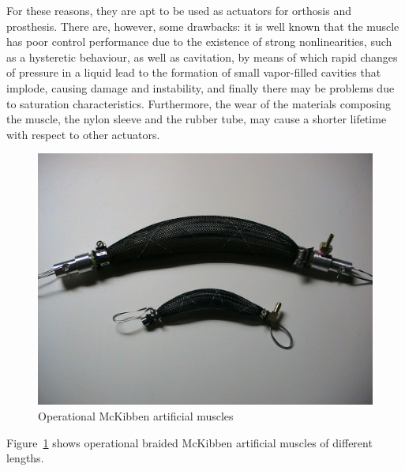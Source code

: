 For these reasons, they are apt to be used as actuators for orthosis and prosthesis.
There are, however, some drawbacks: it is well known that the muscle
has poor control performance due to the existence of strong nonlinearities,
such as a hysteretic behaviour, as well as cavitation, by means of which
rapid changes of pressure in a liquid lead to the formation of small
vapor-filled cavities that implode, causing damage and instability,
and finally there may be problems due to saturation characteristics.
Furthermore, the wear of the materials composing the muscle, the nylon sleeve
and the rubber tube, may cause a shorter lifetime with respect to other actuators.

\begin{figure}[H]
	\centering
	\includegraphics[width=.75\textwidth]{Images/muscle_complete}
	\caption{Operational McKibben artificial muscles}
	\label{fig:mckibben}
\end{figure}

Figure~\ref{fig:mckibben} shows operational braided McKibben
artificial muscles of different lengths.
























